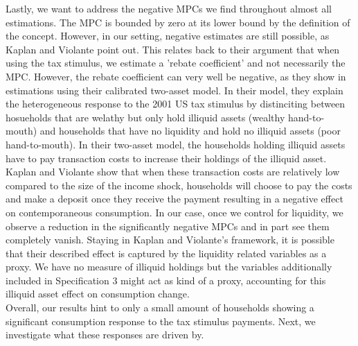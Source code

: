 Lastly, we want to address the negative MPCs we find throughout almost all estimations. The MPC is bounded by zero at its lower bound by the definition of the concept. However, in our setting, negative estimates are still possible, as Kaplan and Violante point out. This relates back to their argument that when using the tax stimulus, we estimate a 'rebate coefficient' and not necessarily the MPC. However, the rebate coefficient can very well be negative, as they show in estimations using their calibrated two-asset model. In their model, they explain the heterogeneous response to the 2001 US tax stimulus by distinciting between hosueholds that are welathy but only hold illiquid assets (wealthy hand-to-mouth) and households that have no liquidity and hold no illiquid assets (poor hand-to-mouth). In their two-asset model, the households holding illiquid assets have to pay transaction costs to increase their holdings of the illiquid asset. Kaplan and Violante show that when these transaction costs are relatively low compared to the size of the income shock, households will choose to pay the costs and make a deposit once they receive the payment resulting in a negative effect on contemporaneous consumption. In our case, once we control for liquidity, we observe a reduction in the significantly negative MPCs and in part see them completely vanish. Staying in Kaplan and Violante's framework, it is possible that their described effect is captured by the liquidity related variables as a proxy. We have no measure of illiquid holdings but the variables additionally included in Specification 3 might act as kind of a proxy, accounting for this illiquid asset effect on consumption change. \\
Overall, our results hint to only a small amount of households showing a significant consumption response to the tax stimulus payments. Next, we investigate what these responses are driven by.